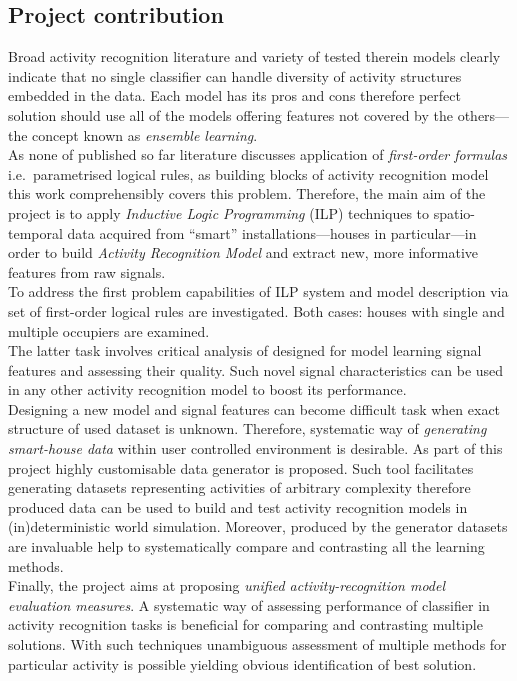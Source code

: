 \documentclass[12pt, a4paper, pdflatex, leqno, twoside, openright]{report}
\begin{document}
    \subsection{Project contribution}
Broad activity recognition literature and variety of tested therein models clearly indicate that no single classifier can handle diversity of activity structures embedded in the data. Each model has its pros and cons therefore perfect solution should use all of the models offering features not covered by the others---the concept known as \emph{ensemble learning}.\\

As none of published so far literature discusses application of \emph{first-order formulas} i.e.\ parametrised logical rules, as building blocks of activity recognition model this work comprehensibly covers this problem. Therefore, the main aim of the project is to apply \emph{Inductive Logic Programming} (ILP) techniques to spatio-temporal data acquired from ``smart'' installations---houses in particular---in order to build \emph{Activity Recognition Model} and extract new, more informative features from raw signals.\\

To address the first problem capabilities of ILP system and model description via set of first-order logical rules are investigated. Both cases: houses with single and multiple occupiers are examined.\\
The latter task involves critical analysis of designed for model learning signal features and assessing their quality. Such novel signal characteristics can be used in any other activity recognition model to boost its performance.\\

Designing a new model and signal features can become difficult task when exact structure of used dataset is unknown. Therefore, systematic way of \emph{generating smart-house data} within user controlled environment is desirable. As part of this project highly customisable data generator is proposed. Such tool facilitates generating datasets representing activities of arbitrary complexity therefore produced data can be used to build and test activity recognition models in (in)deterministic world simulation. Moreover, produced by the generator datasets are invaluable help to systematically compare and contrasting all the learning methods.\\

Finally, the project aims at proposing \emph{unified activity-recognition model evaluation measures}. A systematic way of assessing performance of classifier in activity recognition tasks is beneficial for comparing and contrasting multiple solutions. With such techniques unambiguous assessment of multiple methods for particular activity is possible yielding obvious identification of best solution.
\end{document}
